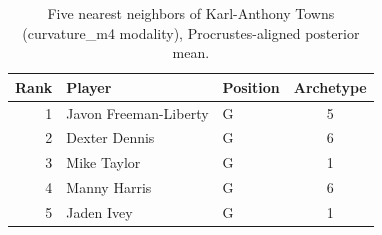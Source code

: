\begin{table}[htbp]
  \centering\small
  \begin{tabular}{rllc}
    \toprule
    Rank & Player & Position & Archetype \\
    \midrule
    1 & Javon Freeman-Liberty & G & 5 \\
    2 & Dexter Dennis & G & 6 \\
    3 & Mike Taylor & G & 1 \\
    4 & Manny Harris & G & 6 \\
    5 & Jaden Ivey & G & 1 \\
    \bottomrule
  \end{tabular}
  \caption{Five nearest neighbors of Karl-Anthony Towns (curvature_m4 modality), Procrustes-aligned posterior mean.}
  \label{tab:Karl_Anthony_Towns_neighbors_curvature_m4}
\end{table}


